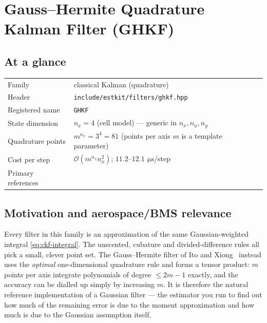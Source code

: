 \chapter{Gauss--Hermite Quadrature Kalman Filter (GHKF)}
\label{ch:ghkf}

\section*{At a glance}
\begin{tabular}{@{}l>{\raggedright\arraybackslash}p{}@{}}
Family & classical Kalman (quadrature) \\
Header & \texttt{include/estkit/filters/ghkf.hpp} \\
Registered name & \texttt{GHKF} \\
State dimension & $n_x = 4$ (cell model) --- generic in $n_x, n_u, n_y$ \\
Quadrature points & $m^{n_x} = 3^4 = 81$ (points per axis $m$ is a template parameter) \\
Cost per step & $\mathcal{O}(m^{n_x} n_x^2)$; $11.2$--$12.1\,\SI{}{\micro\second}$/step \\
Primary references & \cite{ito2000gaussian,arasaratnam2007ghqf,wu2006numerical,golubwelsch1969} \\
\end{tabular}

\section{Motivation and aerospace/BMS relevance}
Every filter in this family is an approximation of the same Gaussian-weighted integral
\eqref{eq:ckf-integral}. The unscented, cubature and divided-difference rules all pick a
small, clever point set. The Gauss--Hermite filter of Ito and Xiong~\cite{ito2000gaussian}
instead uses the \emph{optimal} one-dimensional quadrature rule and forms a tensor product:
$m$ points per axis integrate polynomials of degree $\le 2m-1$ exactly, and the accuracy can
be dialled up simply by increasing $m$. It is therefore the natural reference implementation
of a Gaussian filter --- the estimator you run to find out how much of the remaining error is
due to the moment approximation and how much is due to the Gaussian assumption itself.

